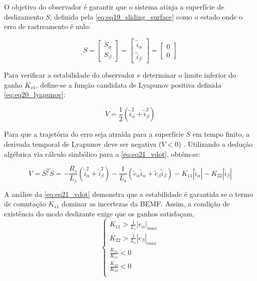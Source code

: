 O objetivo do observador é garantir que o sistema atinja a superfície de deslizamento $S$, definida pela \autoref{eq:eq19_sliding_surface} como o estado onde o erro de rastreamento é nulo:

\begin{equation}
    S = \begin{bmatrix} S_{\alpha} \\ S_{\beta} \end{bmatrix} = \begin{bmatrix} \tilde{i}_{\alpha} \\ \tilde{i}_{\beta}  \end{bmatrix} = \begin{bmatrix} 0 \\ 0 \end{bmatrix}
    \label{eq:eq19_sliding_surface}
\end{equation}

Para verificar a estabilidade do observador e determinar o limite inferior do ganho $K_{s1}$, define-se a função candidata de Lyapunov positiva definida \autoref{eq:eq20_lyapunov}:

\begin{equation}
    V = \frac{1}{2} (\tilde{i}_{\alpha}^2 + \tilde{i}_{\beta}^2)
    \label{eq:eq20_lyapunov}
\end{equation}

Para que a trajetória do erro seja atraída para a superfície $S$ em tempo finito, a derivada temporal de Lyapunov deve ser negativa ($\dot{V} < 0$) \cite{Ogata2010}. Utilizando a dedução algébrica via cálculo simbólico para a \autoref{eq:eq21_vdot}, obtém-se:

\begin{equation}
    \dot{V} = S^T \dot{S} = -\frac{R_s}{L_s}(\tilde{i}_{\alpha}^2 + \tilde{i}_{\beta}^2) - \frac{1}{L_s}(\tilde{e}_{\alpha}\tilde{i}_{\alpha} + \tilde{e}_{\beta}\tilde{i}_{\beta}) - K_{11} |\tilde{i}_{\alpha}| - K_{22} |\tilde{i}_{\beta}|
    \label{eq:eq21_vdot}
\end{equation}

A análise da \eqref{eq:eq21_vdot} demonstra que a estabilidade é garantida se o termo de comutação $K_{s1}$ dominar as incertezas da BEMF. Assim, a condição de existência do modo deslizante exige que os ganhos satisfaçam,
\begin{equation}
    \begin{cases}
        K_{11} > \frac{1}{L_s} | e_{\alpha}|_{max} \\
        K_{22} > \frac{1}{L_s} | e_{\beta}|_{max} \\
        \frac{K_{31}}{K_{11}} < 0 \\
        \frac{K_{42}}{K_{22}} < 0 \\
    \end{cases}
\end{equation}



